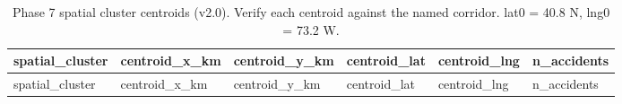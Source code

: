 \documentclass[
]{article}
\begin{document}
\begin{longtable}[]{@{}
  >{\raggedleft\arraybackslash}p{}
  >{\raggedleft\arraybackslash}p{}
  >{\raggedleft\arraybackslash}p{}
  >{\raggedleft\arraybackslash}p{}
  >{\raggedleft\arraybackslash}p{}
  >{\raggedleft\arraybackslash}p{}@{}}
\caption{Phase 7 spatial cluster centroids (v2.0). Verify each centroid
against the named corridor. lat0 = 40.8 N, lng0 = 73.2
W.}\tabularnewline
\toprule\noalign{}
\begin{minipage}[b]{\linewidth}\raggedleft
spatial\_cluster
\end{minipage} & \begin{minipage}[b]{\linewidth}\raggedleft
centroid\_x\_km
\end{minipage} & \begin{minipage}[b]{\linewidth}\raggedleft
centroid\_y\_km
\end{minipage} & \begin{minipage}[b]{\linewidth}\raggedleft
centroid\_lat
\end{minipage} & \begin{minipage}[b]{\linewidth}\raggedleft
centroid\_lng
\end{minipage} & \begin{minipage}[b]{\linewidth}\raggedleft
n\_accidents
\end{minipage} \\
\midrule\noalign{}
\endfirsthead
\toprule\noalign{}
\begin{minipage}[b]{\linewidth}\raggedleft
spatial\_cluster
\end{minipage} & \begin{minipage}[b]{\linewidth}\raggedleft
centroid\_x\_km
\end{minipage} & \begin{minipage}[b]{\linewidth}\raggedleft
centroid\_y\_km
\end{minipage} & \begin{minipage}[b]{\linewidth}\raggedleft
centroid\_lat
\end{minipage} & \begin{minipage}[b]{\linewidth}\raggedleft
centroid\_lng
\end{minipage} & \begin{minipage}[b]{\linewidth}\raggedleft
n\_accidents
\end{minipage} \\

\end{longtable}
\end{document}
